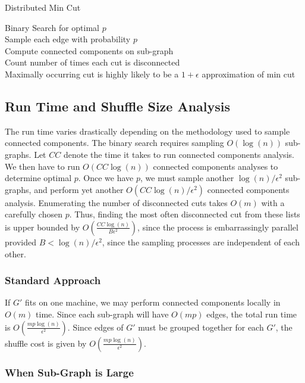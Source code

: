 \documentclass{article}
\begin{document}
\LinesNumbered
\begin{algorithm}[H]
\caption{Distributed Min Cut}
Binary Search for optimal $p$ \\
\IP{}
{
  Sample each edge with probability $p$ \\
  Compute connected components on sub-graph \\
}
Count number of times each cut is disconnected \\
Maximally occurring cut is highly likely to be a $1+\epsilon$ approximation of min cut
\end{algorithm}


\subsection{Run Time and Shuffle Size Analysis}

The run time varies drastically depending on the methodology used to sample connected components. The binary search requires sampling $O(\log(n))$ sub-graphs. Let $CC$ denote the time it takes to run connected components analysis. We then have to run $O(CC \log(n))$ connected components analyses to determine optimal $p$. Once we have $p$, we must sample another $\log(n)/\epsilon^2$ sub-graphs, and perform yet another $O(CC \log(n)/\epsilon^2)$ connected components analysis. Enumerating the number of disconnected cuts takes $O(m)$ with a carefully chosen $p$. Thus, finding the most often disconnected cut from these lists is upper bounded by $O(\frac{CC\log(n)}{B \epsilon^2})$, since the process is embarrassingly parallel provided $B < \log(n)/\epsilon^2$, since the sampling processes are independent of each other.

\subsubsection{Standard Approach}
If $G'$ fits on one machine, we may perform connected components locally in $O(m)$ time. Since each sub-graph will have $O(mp)$ edges,  the total run time is $O(\frac{mp\log(n)}{\epsilon^2})$. 
Since edges of $G'$ must be grouped together for each $G'$, the shuffle cost is given by $O(\frac{mp \log(n)}{\epsilon^2})$.

\subsubsection{When Sub-Graph is Large}
\end{document}
